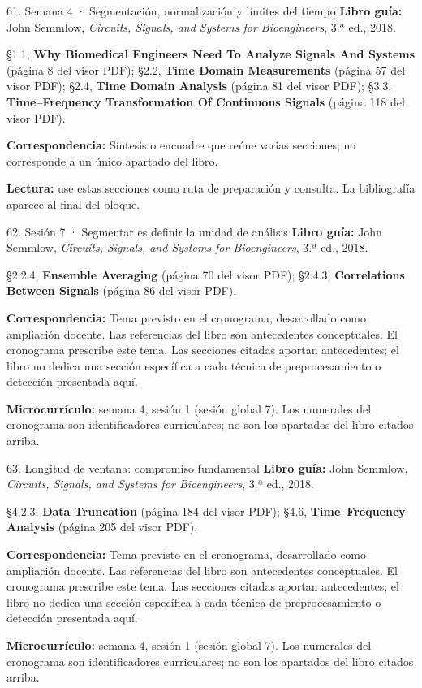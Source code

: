 \documentclass[
  10pt,
  ignorenonframetext,
  aspectratio=169,
  spanish,
]{beamer}
\begin{document}
\begin{frame}{61. Semana 4 · Segmentación, normalización y límites del
tiempo}
\label{semana-4-segmentaciuxf3n-normalizaciuxf3n-y-luxedmites-del-tiempo}
\textbf{Libro guía:} John Semmlow, \emph{Circuits, Signals, and Systems
for Bioengineers}, 3.ª ed., 2018.

§1.1, \textbf{Why Biomedical Engineers Need To Analyze Signals And
Systems} (página 8 del visor PDF); §2.2, \textbf{Time Domain
Measurements} (página 57 del visor PDF); §2.4, \textbf{Time Domain
Analysis} (página 81 del visor PDF); §3.3, \textbf{Time--Frequency
Transformation Of Continuous Signals} (página 118 del visor PDF).

\textbf{Correspondencia:} Síntesis o encuadre que reúne varias
secciones; no corresponde a un único apartado del libro.

\textbf{Lectura:} use estas secciones como ruta de preparación y
consulta. La bibliografía aparece al final del bloque.
\end{frame}

\begin{frame}{62. Sesión 7 · Segmentar es definir la unidad de análisis}
\label{sesiuxf3n-7-segmentar-es-definir-la-unidad-de-anuxe1lisis}
\textbf{Libro guía:} John Semmlow, \emph{Circuits, Signals, and Systems
for Bioengineers}, 3.ª ed., 2018.

§2.2.4, \textbf{Ensemble Averaging} (página 70 del visor PDF); §2.4.3,
\textbf{Correlations Between Signals} (página 86 del visor PDF).

\textbf{Correspondencia:} Tema previsto en el cronograma, desarrollado
como ampliación docente. Las referencias del libro son antecedentes
conceptuales. El cronograma prescribe este tema. Las secciones citadas
aportan antecedentes; el libro no dedica una sección específica a cada
técnica de preprocesamiento o detección presentada aquí.

\textbf{Microcurrículo:} semana 4, sesión 1 (sesión global 7). Los
numerales del cronograma son identificadores curriculares; no son los
apartados del libro citados arriba.
\end{frame}

\begin{frame}{63. Longitud de ventana: compromiso fundamental}
\label{longitud-de-ventana-compromiso-fundamental}
\textbf{Libro guía:} John Semmlow, \emph{Circuits, Signals, and Systems
for Bioengineers}, 3.ª ed., 2018.

§4.2.3, \textbf{Data Truncation} (página 184 del visor PDF); §4.6,
\textbf{Time--Frequency Analysis} (página 205 del visor PDF).

\textbf{Correspondencia:} Tema previsto en el cronograma, desarrollado
como ampliación docente. Las referencias del libro son antecedentes
conceptuales. El cronograma prescribe este tema. Las secciones citadas
aportan antecedentes; el libro no dedica una sección específica a cada
técnica de preprocesamiento o detección presentada aquí.

\textbf{Microcurrículo:} semana 4, sesión 1 (sesión global 7). Los
numerales del cronograma son identificadores curriculares; no son los
apartados del libro citados arriba.
\end{frame}
\end{document}
